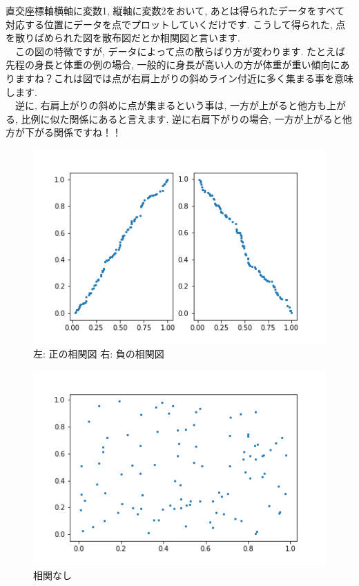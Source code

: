 \documentclass[11pt,a4paper,uplatex]{ujreport}
\begin{document}
直交座標軸横軸に変数1, 縦軸に変数2をおいて, あとは得られたデータをすべて対応する位置にデータを点でプロットしていくだけです. こうして得られた, 点を散りばめられた図を散布図だとか相関図と言います.\\
　この図の特徴ですが, データによって点の散らばり方が変わります. たとえば先程の身長と体重の例の場合, 一般的に身長が高い人の方が体重が重い傾向にありますね？これは図では点が右肩上がりの斜めライン付近に多く集まる事を意味します. \\
　逆に, 右肩上がりの斜めに点が集まるという事は, 一方が上がると他方も上がる, 比例に似た関係にあると言えます. 逆に右肩下がりの場合, 一方が上がると他方が下がる関係ですね！！\\

\begin{figure}[H]
\label{im:scatter1}
  \centering
  \includegraphics[width=120mm,bb=0 0 432 288]{../figures/scatter1.png}
  \caption{左: 正の相関図 右: 負の相関図}
\end{figure}

\begin{figure}[H]
\label{im:scatter2}
  \centering
  \includegraphics[width=120mm,bb=0 0 432 288]{../figures/scatter2.png}
  \caption{相関なし}
\end{figure}
\end{document}
